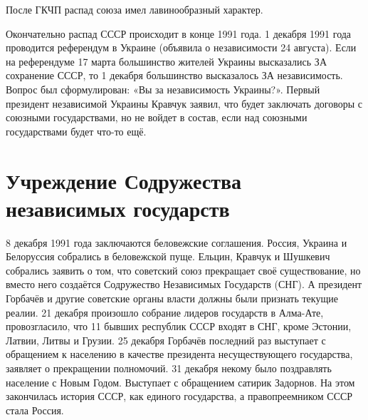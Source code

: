 После ГКЧП распад союза имел лавинообразный характер.

Окончательно распад СССР происходит в конце 1991 года. 1 декабря 1991 года проводится референдум в Украине (объявила о независимости 24 августа). Если на референдуме 17 марта большинство жителей Украины высказались ЗА сохранение СССР, то 1 декабря большинство высказалось ЗА независимость. Вопрос был сформулирован: «Вы за независимость Украины?». Первый президент независимой Украины Кравчук заявил, что будет заключать договоры с союзными государствами, но не войдет в состав, если над союзными государствами будет что-то ещё. 

\section{Учреждение Содружества независимых государств}

8 декабря 1991 года заключаются беловежские соглашения. Россия, Украина и Белоруссия собрались в беловежской пуще. Ельцин, Кравчук и Шушкевич собрались заявить о том, что советский союз прекращает своё существование, но вместо него создаётся Содружество Независимых Государств (СНГ). А президент Горбачёв и другие советские органы власти должны были признать текущие реалии. 
21 декабря произошло собрание лидеров государств в Алма-Ате, провозгласило, что 11 бывших республик СССР входят в СНГ, кроме Эстонии, Латвии, Литвы и Грузии. 25 декабря Горбачёв последний раз выступает с обращением к населению в качестве президента несуществующего государства, заявляет о прекращении полномочий. 31 декабря некому было поздравлять население с Новым Годом. Выступает с обращением сатирик Задорнов. На этом закончилась история СССР, как единого государства, а правопреемником СССР стала Россия.
